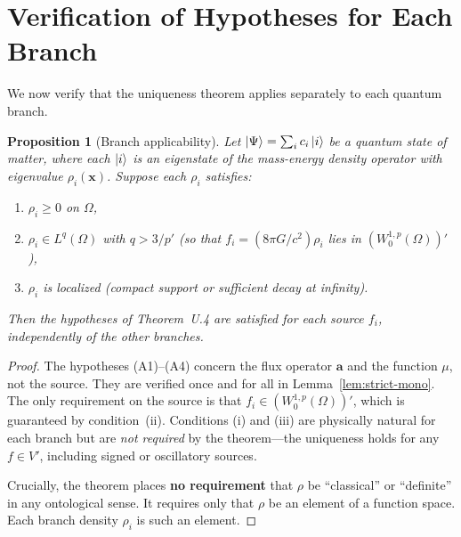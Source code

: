 \documentclass[aps,prd,twocolumn,superscriptaddress,nofootinbib]{revtex4-2}
\newtheorem{proposition}[theorem]{Proposition}
\newcommand{\mufunction}{\mu}
\begin{document}
\section{Verification of Hypotheses for Each Branch}

We now verify that the uniqueness theorem applies separately to each
quantum branch.

\begin{proposition}[Branch applicability]\label{prop:branch-apply}
Let $\ket{\Psi} = \sum_i c_i \ket{i}$ be a quantum state of matter,
where each $\ket{i}$ is an eigenstate of the mass-energy density operator
with eigenvalue $\rho_i(\mathbf{x})$. Suppose each $\rho_i$ satisfies:
\begin{enumerate}
\item[(i)] $\rho_i \geq 0$ on $\Omega$,
\item[(ii)] $\rho_i \in L^q(\Omega)$ with $q > 3/p'$ (so that $f_i = (8\pi G/c^2)\rho_i$
lies in $(W_0^{1,p}(\Omega))'$),
\item[(iii)] $\rho_i$ is localized (compact support or sufficient decay at infinity).
\end{enumerate}
Then the hypotheses of Theorem~U.4 are satisfied for each source $f_i$,
independently of the other branches.
\end{proposition}

\begin{proof}
The hypotheses (A1)--(A4) concern the flux operator $\mathbf{a}$ and the
function $\mufunction$, not the source. They are verified once and for all
in Lemma~\ref{lem:strict-mono}. The only requirement on the source is that
$f_i \in (W_0^{1,p}(\Omega))'$, which is guaranteed by condition~(ii).
Conditions (i) and (iii) are physically natural for each branch but are
\emph{not required} by the theorem---the uniqueness holds for any
$f \in V'$, including signed or oscillatory sources.

Crucially, the theorem places \textbf{no requirement} that $\rho$ be
``classical'' or ``definite'' in any ontological sense. It requires only
that $\rho$ be an element of a function space. Each branch density
$\rho_i$ is such an element.
\end{proof}
\end{document}
